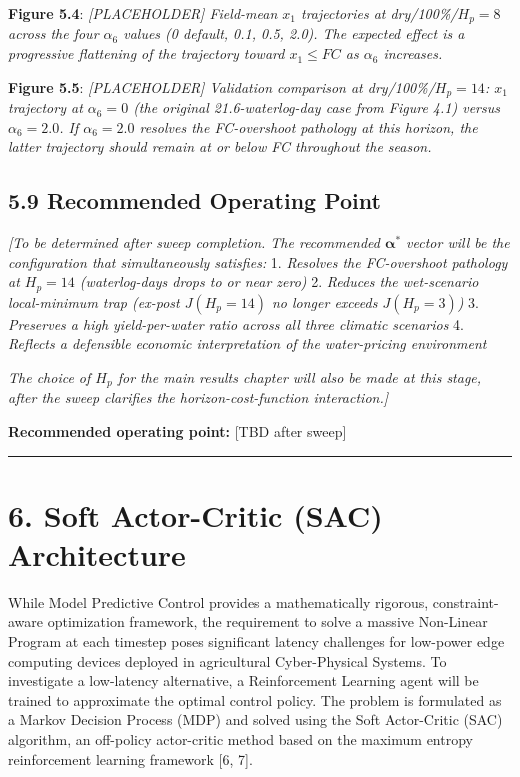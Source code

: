 \textbf{Figure 5.4}: \emph{{[}PLACEHOLDER{]} Field-mean \(x_1\)
trajectories at dry/100\%/\(H_p = 8\) across the four \(\alpha_6\)
values (0 default, 0.1, 0.5, 2.0). The expected effect is a progressive
flattening of the trajectory toward \(x_1 \leq FC\) as \(\alpha_6\)
increases.}

\textbf{Figure 5.5}: \emph{{[}PLACEHOLDER{]} Validation comparison at
dry/100\%/\(H_p = 14\): \(x_1\) trajectory at \(\alpha_6 = 0\) (the
original 21.6-waterlog-day case from Figure 4.1) versus
\(\alpha_6 = 2.0\). If \(\alpha_6 = 2.0\) resolves the FC-overshoot
pathology at this horizon, the latter trajectory should remain at or
below FC throughout the season.}

\subsection{5.9 Recommended Operating
Point}\label{recommended-operating-point}

\emph{{[}To be determined after sweep completion. The recommended
\(\boldsymbol{\alpha}^*\) vector will be the configuration that
simultaneously satisfies:} 1. \emph{Resolves the FC-overshoot pathology
at \(H_p = 14\) (waterlog-days drops to or near zero)} 2. \emph{Reduces
the wet-scenario local-minimum trap (ex-post \(J(H_p = 14)\) no longer
exceeds \(J(H_p = 3)\))} 3. \emph{Preserves a high yield-per-water ratio
across all three climatic scenarios} 4. \emph{Reflects a defensible
economic interpretation of the water-pricing environment}

\emph{The choice of \(H_p\) for the main results chapter will also be
made at this stage, after the sweep clarifies the horizon-cost-function
interaction.{]}}

\textbf{Recommended operating point:} {[}TBD after sweep{]}

\begin{center}\rule{0.5\linewidth}{0.5pt}\end{center}

\section{6. Soft Actor-Critic (SAC)
Architecture}\label{soft-actor-critic-sac-architecture}

While Model Predictive Control provides a mathematically rigorous,
constraint-aware optimization framework, the requirement to solve a
massive Non-Linear Program at each timestep poses significant latency
challenges for low-power edge computing devices deployed in agricultural
Cyber-Physical Systems. To investigate a low-latency alternative, a
Reinforcement Learning agent will be trained to approximate the optimal
control policy. The problem is formulated as a Markov Decision Process
(MDP) and solved using the Soft Actor-Critic (SAC) algorithm, an
off-policy actor-critic method based on the maximum entropy
reinforcement learning framework {[}6, 7{]}.

